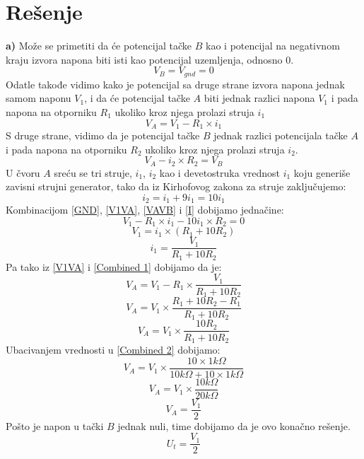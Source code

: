\documentclass{article}
\begin{document}
\section{Rešenje}
    \textbf{a)} Može se primetiti da će potencijal tačke $B$ kao i potencijal na negativnom kraju izvora napona biti isti kao potencijal uzemljenja, odnosno 0.
    \begin{equation}
        \label{GND}
        V_B = V_{gnd} = 0
    \end{equation}
    Odatle takođe vidimo kako je potencijal sa druge strane izvora napona jednak samom naponu $V_1$, i da će potencijal tačke $A$ biti jednak razlici napona $V_1$ i pada napona na otporniku $R_1$ ukoliko kroz njega prolazi struja $i_1$
    \begin{equation}
        \label{V1VA}
        V_A = V_1 - R_1 \times i_1
    \end{equation}
    S druge strane, vidimo da je potencijal tačke $B$ jednak razlici potencijala tačke $A$ i pada napona na otporniku $R_2$ ukoliko kroz njega prolazi struja $i_2$.
    \begin{equation}
        \label{VAVB}
        V_A - i_2 \times R_2 = V_B
    \end{equation}
    U čvoru $A$ sreću se tri struje, $i_1$, $i_2$ kao i devetostruka vrednost $i_1$ koju generiše zavisni strujni generator, tako da iz Kirhofovog zakona za struje zaključujemo:
    \begin{equation}
        \label{I}
        i_2 = i_1 + 9i_1 = 10i_1
    \end{equation}
    Kombinacijom \eqref{GND}, \eqref{V1VA}, \eqref{VAVB} i \eqref{I} dobijamo jednačine:
    $$V_1 - R_1 \times i_1 - 10i_1 \times R_2 = 0$$
    $$V_1 = i_1 \times (R_1 + 10R_2)$$
    \begin{equation}
        \label{Combined 1}
        i_1 = \frac{V_1}{R_1 + 10R_2}
    \end{equation}
    Pa tako iz \eqref{V1VA} i \eqref{Combined 1} dobijamo da je:
    $$V_A = V_1 - R_1 \times \frac{V_1}{R_1 + 10R_2}$$
    $$V_A = V_1 \times \frac{R_1 + 10R_2 - R_1}{R_1 + 10R_2}$$
    \begin{equation}
        \label{Combined 2}
        V_A = V_1 \times \frac{10R_2}{R_1 + 10R_2}
    \end{equation}
    Ubacivanjem vrednosti u \eqref{Combined 2} dobijamo:
    $$V_A = V_1 \times \frac{10 \times 1k\Omega}{10k\Omega + 10 \times 1k\Omega}$$
    $$V_A = V_1 \times \frac{10k\Omega}{20k\Omega}$$
    $$V_A = \frac{V_1}{2}$$
    Pošto je napon u tački $B$ jednak nuli, time dobijamo da je ovo konačno rešenje.
    $$U_t = \frac{V_1}{2}$$
\end{document}
